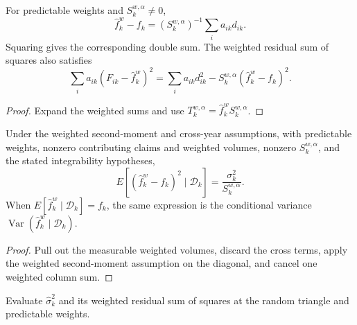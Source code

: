 \begin{lemma}\label{lem:mwVarianceAlgebra}\leanok
{}
For predictable weights and $S_k^{w,\alpha}\ne0$,
\[
  \hat f_k^w-f_k=(S_k^{w,\alpha})^{-1}\sum_i a_{ik}d_{ik}.
\]
Squaring gives the corresponding double sum. The weighted residual sum of squares also satisfies
\[
  \sum_i a_{ik}(F_{ik}-\hat f_k^w)^2
  =\sum_i a_{ik}d_{ik}^2-S_k^{w,\alpha}(\hat f_k^w-f_k)^2.
\]
\end{lemma}
\begin{proof}\leanok Expand the weighted sums and use
$T_k^{w,\alpha}=\hat f_k^w S_k^{w,\alpha}$. \end{proof}

\begin{theorem}\label{thm:mwVariance}\leanok
{}
Under the weighted second-moment and cross-year assumptions, with predictable weights,
nonzero contributing claims and weighted volumes, nonzero $S_k^{w,\alpha}$, and the stated
integrability hypotheses,
\[
  E[(\hat f_k^w-f_k)^2\mid\mathcal D_k]
  =\frac{\sigma_k^2}{S_k^{w,\alpha}}.
\]
When $E[\hat f_k^w\mid\mathcal D_k]=f_k$, the same expression is the conditional variance
$\operatorname{Var}(\hat f_k^w\mid\mathcal D_k)$.
\end{theorem}
\begin{proof}\leanok Pull out the measurable weighted volumes, discard the cross terms, apply
the weighted second-moment assumption on the diagonal, and cancel one weighted column sum.
\end{proof}

\begin{definition}\label{def:mwSigmaRv}\leanok
{}
Evaluate $\hat\sigma_k^2$ and its weighted residual sum of squares at the random triangle and
predictable weights.
\end{definition}

